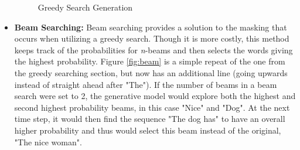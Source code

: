 \documentclass[12pt]{report}
\begin{document}
\begin{itemize}
            \begin{figure}[H]
            \begin{center}
            \caption{Greedy Search Generation ~\cite{HF}}
            \label{fig:greedy}
            \end{center}
            \end{figure}
            
            \newpage
            
            \item \textbf{Beam Searching:} Beam searching provides a solution to the masking that occurs when utilizing a greedy search. Though it is more costly, this method keeps track of the probabilities for \textit{n}-beams and then selects the words giving the highest probability. Figure \ref{fig:beam} is a simple repeat of the one from the greedy searching section, but now has an additional line (going upwards instead of straight ahead after "The"). If the number of beams in a beam search were set to 2, the generative model would explore both the highest and second highest probability beams, in this case "Nice" and "Dog". At the next time step, it would then find the sequence "The dog has" to have an overall higher probability and thus would select this beam instead of the original, "The nice woman".
            

\end{itemize}
\end{document}
